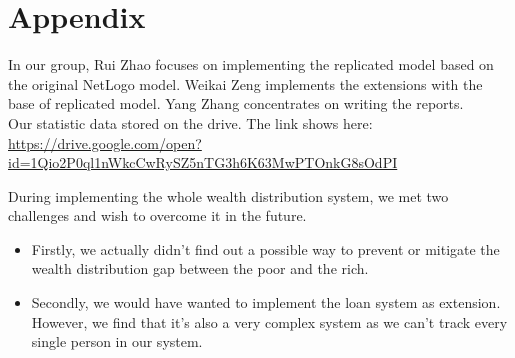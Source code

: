 \section*{Appendix}
In our group, Rui Zhao focuses on implementing the replicated model based on the original NetLogo model. Weikai Zeng implements the extensions with the base of replicated model. Yang Zhang concentrates on writing the reports.\\

Our statistic data stored on the drive. The link shows here: \url{https://drive.google.com/open?id=1Qio2P0ql1nWkcCwRySZ5nTG3h6K63MwPTOnkG8sOdPI}

During implementing the whole wealth distribution system, we met two challenges and wish to overcome it in the future.
\begin{itemize}
	\item Firstly, we actually didn't find out a possible way to prevent or mitigate the wealth distribution gap between the poor and the rich. 
	\item Secondly, we would have wanted to implement the loan system as extension. However, we find
	that it's also a very complex system as we can't track every single person in our system.
\end{itemize} 


